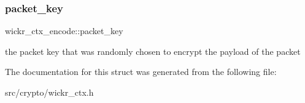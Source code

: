 \subsubsection{\texorpdfstring{packet\+\_\+key}{packet\_key}}
{\footnotesize\ttfamily wickr\+\_\+ctx\+\_\+encode\+::packet\+\_\+key}

the packet key that was randomly chosen to encrypt the payload of the packet 

The documentation for this struct was generated from the following file\+:\begin{DoxyCompactItemize}
\item 
src/crypto/wickr\+\_\+ctx.\+h\end{DoxyCompactItemize}
